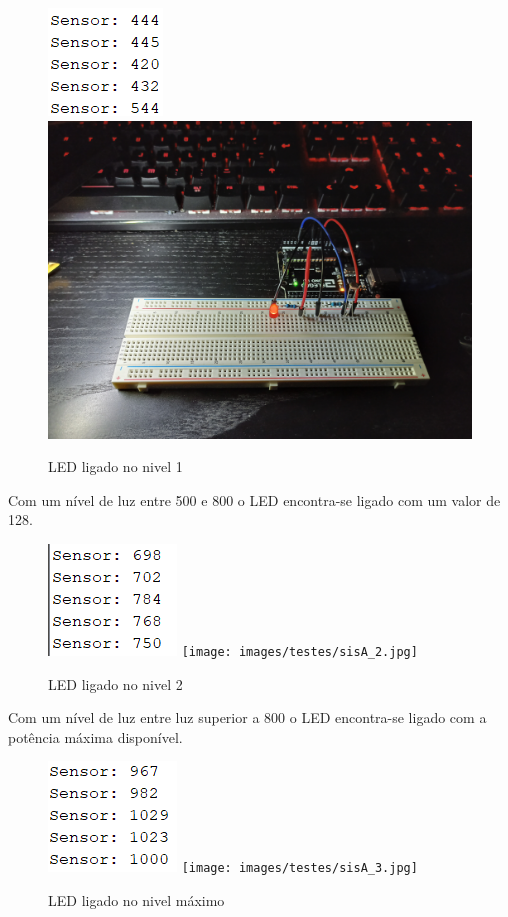 \begin{figure}[H]
    \centering
    \includegraphics[scale=1.1]{images/testes/sisA_SerialMonitor1_original.png}
    \includegraphics[scale=0.03]{images/testes/sisA_1.jpg}
    \caption{LED ligado no nivel 1}
\end{figure}

Com um nível de luz entre 500 e 800 o LED encontra-se ligado com um valor de 128.

\begin{figure}[H]
    \centering
    \includegraphics[scale=1.1]{images/testes/sisA_SerialMonitor2_original.png}
    \texttt{[image: images/testes/sisA\_2.jpg]}
    \caption{LED ligado no nivel 2}
\end{figure}

Com um nível de luz entre luz superior a 800 o LED encontra-se ligado com a potência máxima disponível.

\begin{figure}[H]
    \centering
    \includegraphics[scale=1.1]{images/testes/sisA_SerialMonitor3_original.png}
    \texttt{[image: images/testes/sisA\_3.jpg]}
    \caption{LED ligado no nivel máximo}
\end{figure}